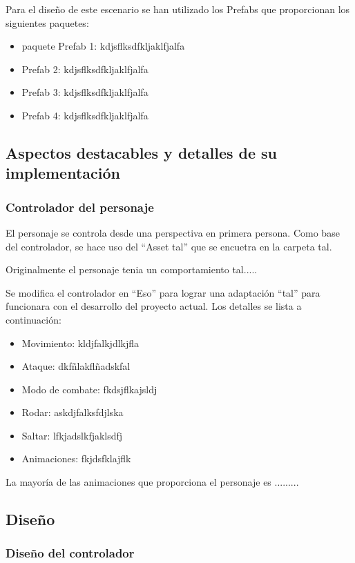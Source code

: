 Para el diseño de este escenario se han utilizado los Prefabs que proporcionan los siguientes paquetes:
\begin{itemize}
	\item paquete Prefab 1: kdjsflksdfkljaklfjalfa
	\item Prefab 2: kdjsflksdfkljaklfjalfa
	\item Prefab 3: kdjsflksdfkljaklfjalfa
	\item Prefab 4: kdjsflksdfkljaklfjalfa
\end{itemize}

\subsection{Aspectos destacables y detalles de su implementación}

\subsubsection{Controlador del personaje}
El personaje se controla desde una perspectiva en primera persona. Como base del controlador,  se hace uso del ``Asset tal'' que se encuetra en la carpeta tal.

Originalmente el personaje tenia un comportamiento tal.....

Se modifica el controlador en ``Eso'' para lograr una adaptación ``tal'' para funcionara con el desarrollo del proyecto actual. Los detalles se lista a continuación:

\begin{itemize}
	\item Movimiento: kldjfalkjdlkjfla
	\item Ataque: dkfñlakflñadskfal
	\item Modo de combate: fkdsjflkajsldj
	\item Rodar: askdjfalksfdjlska
	\item Saltar: lfkjadslkfjaklsdfj
	\item Animaciones: fkjdsfklajflk
\end{itemize}

La mayoría de las animaciones que proporciona el personaje es .........

\subsection{Diseño}

\subsubsection{Diseño del controlador}


